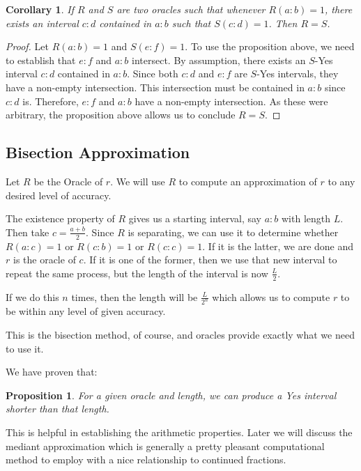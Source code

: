 \documentclass[12pt]{article}
\newtheorem{corollary}{Corollary}
\newtheorem{proposition}{Proposition}
\theoremstyle{remark}
\begin{document}
\begin{corollary}
    If $R$ and $S$ are two oracles such that whenever $R(a:b) = 1$, there exists an interval $c:d$ contained in $a:b$ such that $S(c:d) = 1$. Then $R=S$.
\end{corollary}

\begin{proof}
Let $R(a:b)=1$ and $S(e:f) = 1$. To use the proposition above, we need to establish that $e:f$ and $a:b$ intersect. By assumption, there exists an $S$-Yes interval $c:d$ contained in $a:b$. Since both $c:d$ and $e:f$ are $S$-Yes intervals, they have a non-empty intersection. This intersection must be contained in $a:b$ since $c:d$ is. Therefore, $e:f$ and $a:b$ have a non-empty intersection. As these were arbitrary, the proposition above allows us to conclude $R=S$.
\end{proof}


\subsection{Bisection Approximation}

Let $R$ be the Oracle of $r$. We will use $R$ to compute an approximation of $r$ to any desired level of accuracy. 

The existence property of $R$ gives us a starting interval, say $a:b$ with length $L$. Then take $c = \frac{a+b}{2}$. Since $R$ is separating, we can use it to determine whether $R(a:c) = 1$ or $R(c:b) = 1$ or $R(c:c) = 1$. If it is the latter, we are done and $r$  is the oracle of $c$. If it is one of the former, then we use that new interval to repeat the same process, but the length of the interval is now $\frac{L}{2}$. 

If we do this $n$ times, then the length will be $\frac{L}{2^n}$ which allows us to compute $r$ to be within any level of given accuracy. 

This is the bisection method, of course, and oracles provide exactly what we need to use it. 

We have proven that: 

\begin{proposition}\label{pr:short}
For a given oracle and length, we can produce a Yes interval shorter than that length. 
\end{proposition}

This is helpful in establishing the arithmetic properties. Later we will discuss the mediant approximation which is generally a pretty pleasant computational method to employ with a nice relationship to continued fractions. 
\end{document}
